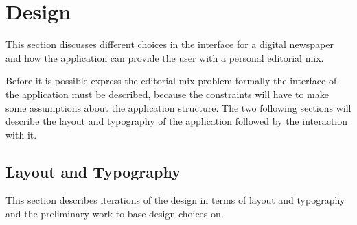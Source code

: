 \chapter{Design} %
\label{ch:design1}
This section discusses different choices in the interface for a digital newspaper and how the application can provide the user with a personal editorial mix.

Before it is possible express the editorial mix problem formally the interface of the application must be described, because the constraints will have to make some assumptions about the application structure. The two following sections will describe the layout and typography of the application followed by the interaction with it.

\section{Layout and Typography}%
\label{sec:layout_typography}
This section describes iterations of the design in terms of layout and typography and the preliminary work to base design choices on.

